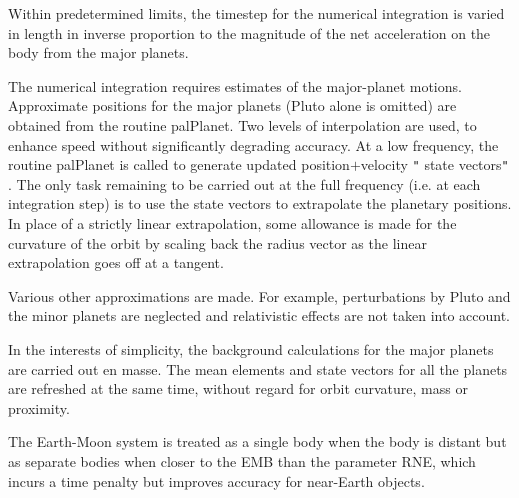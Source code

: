 \documentclass[twoside,11pt,nolof]{starlink}
\begin{document}
{{        Within predetermined limits, the timestep for the numerical
        integration is varied in length in inverse proportion to the
        magnitude of the net acceleration on the body from the major
        planets.

        The numerical integration requires estimates of the major-planet
        motions.  Approximate positions for the major planets (Pluto
        alone is omitted) are obtained from the routine palPlanet.  Two
        levels of interpolation are used, to enhance speed without
        significantly degrading accuracy.  At a low frequency, the routine
        palPlanet is called to generate updated position$+$velocity \texttt{"} state
        vectors\texttt{"} .  The only task remaining to be carried out at the full
        frequency (i.e. at each integration step) is to use the state
        vectors to extrapolate the planetary positions.  In place of a
        strictly linear extrapolation, some allowance is made for the
        curvature of the orbit by scaling back the radius vector as the
        linear extrapolation goes off at a tangent.

        Various other approximations are made.  For example, perturbations
        by Pluto and the minor planets are neglected and relativistic
        effects are not taken into account.

        In the interests of simplicity, the background calculations for
        the major planets are carried out en masse.  The mean elements and
        state vectors for all the planets are refreshed at the same time,
        without regard for orbit curvature, mass or proximity.

        The Earth-Moon system is treated as a single body when the body is
        distant but as separate bodies when closer to the EMB than the
        parameter RNE, which incurs a time penalty but improves accuracy
        for near-Earth objects.

   }
}
\end{document}
